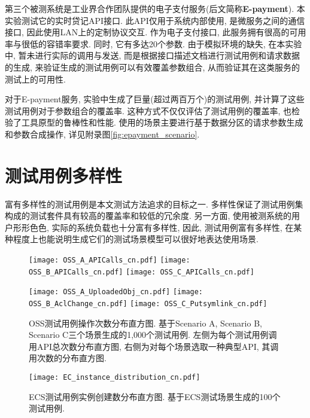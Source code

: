        第三个被测系统是工业界合作团队提供的电子支付服务(后文简称\textbf{E-payment}). 本实验测试它的实时贷记API接口. 此API仅用于系统内部使用, 是微服务之间的通信接口, 因此使用LAN上的定制协议交互. 作为电子支付接口, 此服务拥有很高的可用率与很低的容错率要求. 同时, 它有多达20个参数. 由于模拟环境的缺失, 在本实验中, 暂未进行实际的调用与发送, 而是根据接口描述文档进行测试用例和请求数据的生成, 来验证生成的测试用例可以有效覆盖参数组合, 从而验证其在这类服务的测试上的可用性.
        
        对于E-payment服务, 实验中生成了巨量(超过两百万个)的测试用例, 并计算了这些测试用例对于参数组合的覆盖率. 这种方式不仅仅评估了测试用例的覆盖率, 也检验了工具原型的鲁棒性和性能. 使用的场景主要进行基于数据分区的请求参数生成和参数合成操作, 详见附录图\ref{fig:epayment_scenario}.
        
    
    \section{测试用例多样性}
        富有多样性的测试用例是本文测试方法追求的目标之一. 多样性保证了测试用例集构成的测试套件具有较高的覆盖率和较低的冗余度. 另一方面, 使用被测系统的用户形形色色, 实际的系统负载也十分富有多样性, 因此, 测试用例富有多样性, 在某种程度上也能说明生成它们的测试场景模型可以很好地表达使用场景.
        
        \begin{figure}[!htb]
            \begin{minipage}{0.5\textwidth}
                \centering
                \texttt{[image: OSS\_A\_APICalls\_cn.pdf]}
                \texttt{[image: OSS\_B\_APICalls\_cn.pdf]}
                \texttt{[image: OSS\_C\_APICalls\_cn.pdf]}
            \end{minipage}
            \begin{minipage}{0.5\textwidth}
                \centering
                \texttt{[image: OSS\_A\_UploadedObj\_cn.pdf]}
                \texttt{[image: OSS\_B\_AclChange\_cn.pdf]}
                \texttt{[image: OSS\_C\_Putsymlink\_cn.pdf]}
            \end{minipage}
            \caption{OSS测试用例操作次数分布直方图. 基于Scenario A, Scenario B, Scenario C三个场景生成的1,000个测试用例. 左侧为每个测试用例调用API总次数分布直方图, 右侧为对每个场景选取一种典型API, 其调用次数的分布直方图.}
            \label{fig:OSS_stat}
        \end{figure}
        
        \begin{figure}[!htb]
            \centering
            \texttt{[image: EC\_instance\_distribution\_cn.pdf]}
            \caption{ECS测试用例实例创建数分布直方图. 基于ECS测试场景生成的100个测试用例.}
            \label{fig:ECS_stat}
        \end{figure}
        
